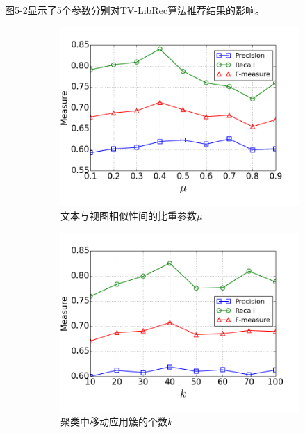图5-2显示了5个参数分别对TV-LibRec算法推荐结果的影响。
\begin{figure}
	\centering
	\begin{subfigure}[b]{0.49\textwidth}		\includegraphics[width=\textwidth]{figures/para_mu}
		\caption{文本与视图相似性间的比重参数$\mu$}
	\end{subfigure}
	\begin{subfigure}[b]{0.49\textwidth}
		\includegraphics[width=\textwidth]{figures/para_k}
		\caption{聚类中移动应用簇的个数$k$}
	\end{subfigure}
	\begin{subfigure}[b]{0.49\textwidth}

\end{subfigure}
\end{figure}
